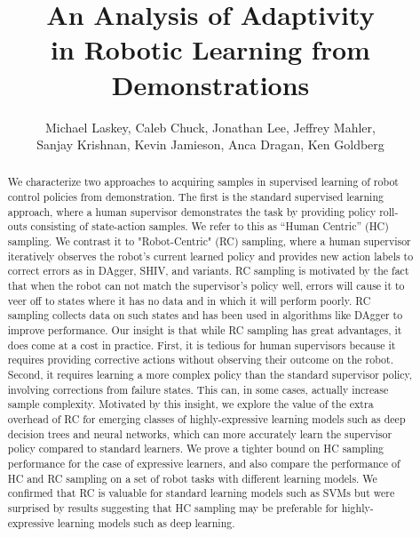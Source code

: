 \documentclass[10pt, conference]{ieeeconf}      %
\title{An Analysis of Adaptivity
 \\in  Robotic Learning from Demonstrations}
\author{Michael Laskey, Caleb Chuck, Jonathan Lee, Jeffrey Mahler,\\ Sanjay Krishnan, Kevin Jamieson, Anca Dragan, Ken Goldberg}
\begin{document}
\maketitle
\thispagestyle{empty}
\pagestyle{empty}







\begin{abstract}
We characterize two approaches to acquiring samples in supervised learning of robot control policies from demonstration. The first is the standard supervised learning approach, where a human supervisor demonstrates the task by providing policy roll-outs consisting of state-action samples. We refer to this as “Human Centric” (HC) sampling. We contrast it to "Robot-Centric" (RC) sampling, where a human supervisor iteratively observes the robot’s current learned policy and provides new action labels to correct errors as in DAgger, SHIV, and variants.  RC sampling is motivated by the fact that when the robot can not match the supervisor’s policy well, errors will cause it to veer off to states where it has no data and in which it will perform poorly. RC sampling collects data on such states and has been used in algorithms like DAgger to improve performance. Our insight is that while RC sampling has great advantages, it does come at a cost in practice. First, it is tedious for human supervisors because it requires providing corrective actions without observing their outcome on the robot. Second, it requires learning a more complex policy than the standard supervisor policy, involving corrections from failure states. This can, in some cases, actually increase sample complexity.  Motivated by this insight, we explore the value of the extra overhead of RC for emerging classes of highly-expressive learning models such as deep decision trees and neural networks, which can more accurately learn the supervisor policy compared to standard learners.  We prove a tighter bound on HC sampling performance for the case of expressive learners, and also compare the performance of HC and RC sampling on a set of robot tasks with different learning models.  We confirmed that RC is valuable for standard learning models such as SVMs but were surprised by results suggesting that HC sampling may be preferable for highly-expressive learning models such as deep learning.

 \end{abstract}
\end{document}
